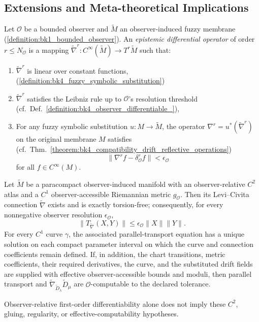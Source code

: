 \subsection{Extensions and Meta-theoretical Implications} \label{subsec:bk4_extensions_meta_theoretical_implications}
\begin{definition} \label{definition:bk4_epistemic_differential_o}
Let $\mathcal{O}$ be a bounded observer and $\tilde{M}$ an observer-induced fuzzy membrane (\ref{definition:bk1_bounded_observer}). An \emph{epistemic differential operator} of order $r \leq N_\mathcal{O}$ is a mapping $\tilde{\nabla}^r: C^\infty(\tilde{M}) \to T^r\tilde{M}$ such that:
\begin{enumerate}
\item $\tilde{\nabla}^r$ is linear over constant functions, (\ref{definition:bk4_fuzzy_symbolic_substitution})
\item $\tilde{\nabla}^r$ satisfies the Leibniz rule up to $\mathcal{O}$'s resolution threshold (cf.~Def.~\ref{definition:bk4_observer_differentiable_}),
\item For any fuzzy symbolic substitution $u: M \to \tilde{M}$, the operator $\nabla^r = u^*(\tilde{\nabla}^r)$ on the original membrane $M$ satisfies (cf.~Thm.~\ref{theorem:bk4_compatibility_drift_reflective_operations})
    \[
    \|\nabla^r f - \delta^r_\mathcal{O} f\| < \epsilon_\mathcal{O}
    \]
    for all $f \in C^\infty(M)$.
\end{enumerate}
\end{definition}
\begin{proposition}
\label{proposition:bk4_fuzzy_connection}
Let $\tilde M$ be a paracompact observer-induced manifold with an
observer-relative $C^2$ atlas and a $C^1$ observer-accessible Riemannian metric
$g_{\mathcal O}$.  Then its Levi--Civita connection $\tilde\nabla$ exists and is
exactly torsion-free; consequently, for every nonnegative observer resolution
$\epsilon_{\mathcal O}$,
\begin{equation}
\|T_{\tilde\nabla}(X,Y)\|
 \leq \epsilon_{\mathcal O}\|X\|\|Y\|.
\end{equation}
For every $C^1$ curve $\gamma$, the associated parallel-transport equation has
a unique solution on each compact parameter interval on which the curve and
connection coefficients remain defined.  If, in addition, the chart
transitions, metric coefficients, their required derivatives, the curve, and
the substituted drift fields are supplied with effective observer-accessible
bounds and moduli, then parallel transport and
$\tilde\nabla_{\tilde D_\lambda}\tilde D_\mu$ are
$\mathcal O$-computable to the declared tolerance.

Observer-relative first-order differentiability alone does not imply these
$C^2$, gluing, regularity, or effective-computability hypotheses.
\end{proposition}

